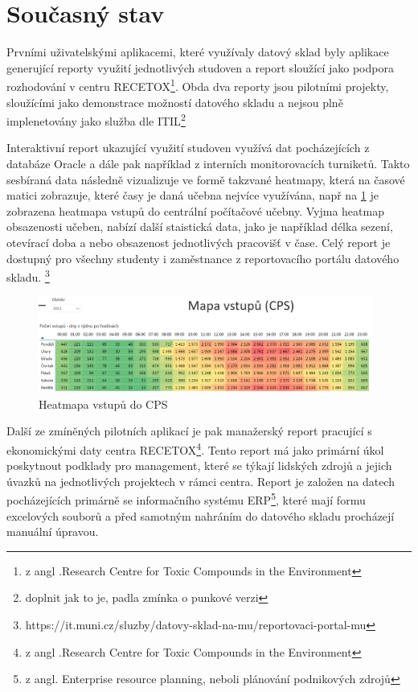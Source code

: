 \documentclass[
  digital,     %
  twoside,     %
  lof,         %
  lot,         %
]{fithesis4}
\begin{document}
\section{Současný stav}
Prvními uživatelskými aplikacemi, které využívaly datový sklad byly aplikace generující reporty využití jednotlivých studoven a report sloužící jako podpora rozhodování v centru RECETOX\footnote{z angl .Research Centre for Toxic Compounds in the Environment}. Obda dva reporty jsou pilotními projekty, sloužícími jako demonstrace možností datového skladu a nejsou plně implenetovány jako služba dle ITIL\footnote{doplnit jak to je, padla zmínka o punkové verzi}

Interaktivní report ukazující využití studoven využívá dat pocházejících z databáze Oracle a dále pak například z interních monitorovacích turniketů. Takto sesbíraná data následně vizualizuje ve formě takzvané heatmapy, která na časové matici zobrazuje, které časy je daná učebna nejvíce využívána, např na \ref{fig:cps} je zobrazena heatmapa vstupů do centrální počítačové učebny. Vyjma heatmap obsazenosti učeben, nabízí další staistická data, jako je například délka sezení, otevírací doba a nebo obsazenost jednotlivých pracovišť v čase. Celý report je dostupný pro všechny studenty i zaměstnance z reportovacího portálu datového skladu. \footnote{https://it.muni.cz/sluzby/datovy-sklad-na-mu/reportovaci-portal-mu}

    \begin{figure}[t]
        \begin{center}
            \includegraphics[width=11cm]{img/ucebny.png}
        \end{center}
        \caption{Heatmapa vstupů do CPS}
        \label{fig:cps}
    \end{figure} 
 
Další ze zmíněných pilotních aplikací je pak manažerský report pracující s ekonomickými daty centra RECETOX\footnote{z angl .Research Centre for Toxic Compounds in the Environment}. Tento report má jako primární úkol poskytnout podklady pro management, které se týkají lidských zdrojů a jejich úvazků na jednotlivých projektech v rámci centra. Report je  založen na datech pocházejících primárně se informačního systému ERP\footnote{z angl. Enterprise resource planning, neboli plánování podnikových zdrojů}, které mají formu excelových souborů a před samotným nahráním do datového skladu procházejí manuální úpravou.
\end{document}
